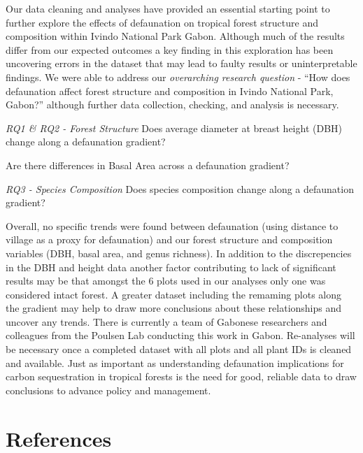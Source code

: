 \documentclass[
  12pt,
]{article}
\begin{document}
Our data cleaning and analyses have provided an essential starting point
to further explore the effects of defaunation on tropical forest
structure and composition within Ivindo National Park Gabon. Although
much of the results differ from our expected outcomes a key finding in
this exploration has been uncovering errors in the dataset that may lead
to faulty results or uninterpretable findings. We were able to address
our \emph{overarching research question} - ``How does defaunation affect
forest structure and composition in Ivindo National Park, Gabon?''
although further data collection, checking, and analysis is necessary.

\emph{RQ1 \& RQ2 - Forest Structure} Does average diameter at breast
height (DBH) change along a defaunation gradient?

Are there differences in Basal Area across a defaunation gradient?

\emph{RQ3 - Species Composition} Does species composition change along a
defaunation gradient?

Overall, no specific trends were found between defaunation (using
distance to village as a proxy for defaunation) and our forest structure
and composition variables (DBH, basal area, and genus richness). In
addition to the discrepencies in the DBH and height data another factor
contributing to lack of significant results may be that amongst the 6
plots used in our analyses only one was considered intact forest. A
greater dataset including the remaming plots along the gradient may help
to draw more conclusions about these relationships and uncover any
trends. There is currently a team of Gabonese researchers and colleagues
from the Poulsen Lab conducting this work in Gabon. Re-analyses will be
necessary once a completed dataset with all plots and all plant IDs is
cleaned and available. Just as important as understanding defaunation
implications for carbon sequestration in tropical forests is the need
for good, reliable data to draw conclusions to advance policy and
management.

\newpage

\hypertarget{references}{%
\section{References}\label{references}}
\end{document}

